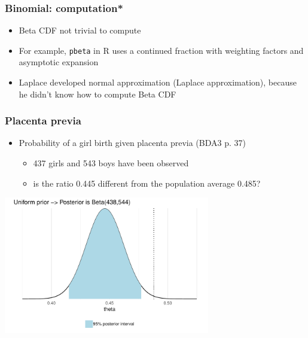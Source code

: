 \documentclass[english,t]{beamer}
\begin{document}
\begin{frame}
  \frametitle{Binomial: computation*}

  \begin{itemize}
  \item Beta CDF not trivial to compute
  \item For example, {\tt pbeta} in R uses a continued fraction with
    weighting factors and asymptotic expansion
  \item Laplace developed normal approximation (Laplace
    approximation), because he didn't know how to compute Beta CDF
  \end{itemize}

\end{frame}

\begin{frame}
  \frametitle{Placenta previa}

  \begin{itemize}
  \item Probability of a girl birth given placenta previa (BDA3 p. 37)
    \begin{itemize}
    \item 437 girls and 543 boys have been observed
    \item is the ratio 0.445 different from the population average 0.485?
    \end{itemize}
  \end{itemize}
  \pause
  \includegraphics[width=9cm]{figs/demo2_1.pdf}
\end{frame}

\end{document}
